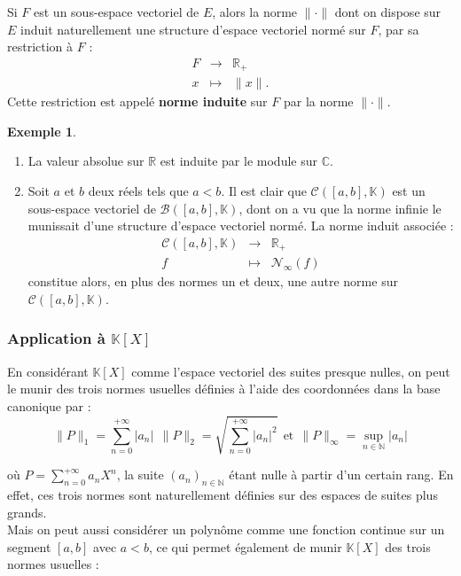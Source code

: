 \documentclass[french]{article}
\newcommand{\N}{\mathbb{N}}
\newcommand{\R}{\mathbb{R}}
\newcommand{\C}{\mathbb{C}}
\newcommand{\K}{\mathbb{K}}
\theoremstyle{plain}
\theoremstyle{definition}
\newtheorem*{ex}{Exemple}
\theoremstyle{remark}
\begin{document}
Si $F$ est un sous-espace vectoriel de $E$, alors la norme $\lVert \cdot\rVert$ dont on dispose sur $E$ induit naturellement une structure d'espace vectoriel normé sur $F$, par sa restriction à $F$ : $$\begin{array}{rcl}
	F&\longrightarrow&\R_+\\
	x&\longmapsto&\lVert x\rVert.
\end{array}$$ Cette restriction est appelé \textbf{norme induite} sur $F$ par la norme $\lVert\cdot\rVert$.

\begin{ex}
	\begin{enumerate}
		\item La valeur absolue sur $\R$ est induite par le module sur $\C$.
		\item Soit $a$ et $b$ deux réels tels que $a<b$. Il est clair que $\mathcal{C}([a,b],\K)$ est un sous-espace vectoriel de $\mathcal{B}([a,b],\K)$, dont on a vu que la norme infinie le munissait d'une structure d'espace vectoriel normé. La norme induit associée : $$\begin{array}{rcl}
			\mathcal{C}([a,b],\K)&\longrightarrow&\R_+\\
			f&\longmapsto&\mathcal{N}_\infty(f)
		\end{array}$$ constitue alors, en plus des normes un et deux, une autre norme sur $\mathcal{C}([a,b],\K)$.
	\end{enumerate}
\end{ex}

\subsubsection*{Application à $\K[X]$}

En considérant $\K[X]$ comme l'espace vectoriel des suites presque nulles, on peut le munir des trois normes usuelles définies à l'aide des coordonnées dans la base canonique par :
$$\lVert P\rVert_1=\sum_{n=0}^{+\infty}\lvert a_n\rvert\ \ \lVert P\rVert_2=\sqrt{\sum_{n=0}^{+\infty}\lvert a_n\rvert^2}\ \ \text{et}\ \ \lVert P\rVert_\infty=\underset{n\in\N}{\sup}\lvert a_n\rvert$$

où $P=\displaystyle\sum_{n=0}^{+\infty}a_nX^n$, la suite $(a_n)_{n\in\N}$ étant nulle à partir d'un certain rang. En effet, ces trois normes sont naturellement définies sur des espaces de suites plus grands.\\
Mais on peut aussi considérer un polynôme comme une fonction continue sur un segment $[a,b]$ avec $a<b$, ce qui permet également de munir $\K[X]$ des trois normes usuelles : 
\end{document}
